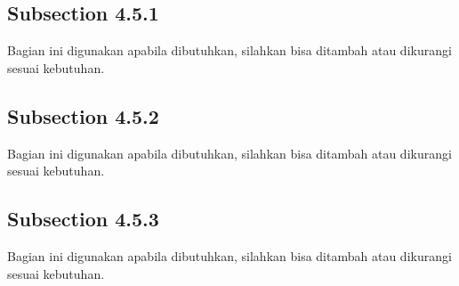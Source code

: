 \subsection{Subsection 4.5.1}
Bagian ini digunakan apabila dibutuhkan, silahkan bisa ditambah atau dikurangi sesuai kebutuhan.

\subsection{Subsection 4.5.2}
Bagian ini digunakan apabila dibutuhkan, silahkan bisa ditambah atau dikurangi sesuai kebutuhan.

\subsection{Subsection 4.5.3}
Bagian ini digunakan apabila dibutuhkan, silahkan bisa ditambah atau dikurangi sesuai kebutuhan.